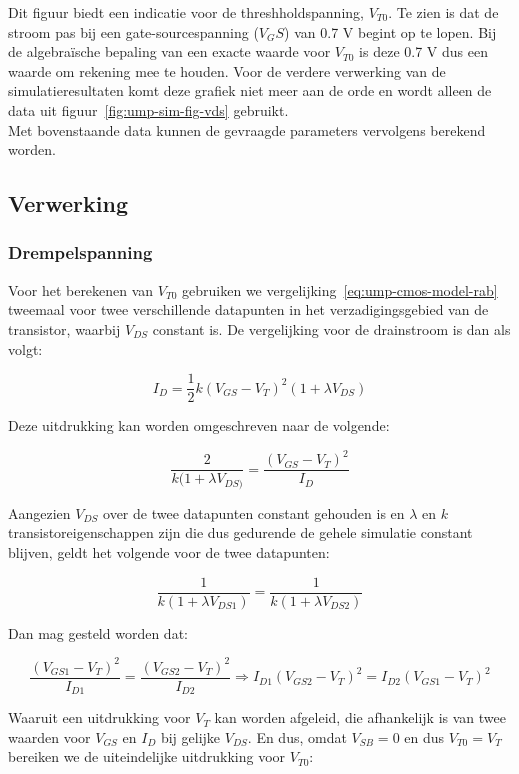 \documentclass{article}
\begin{document}
Dit figuur biedt een indicatie voor de threshholdspanning, $V_{T0}$. Te zien is dat de stroom pas bij een gate-sourcespanning ($V_GS$) van 0.7 V begint op te lopen. Bij de algebraïsche bepaling van een exacte waarde voor $V_{T0}$ is deze 0.7 V dus een waarde om rekening mee te houden. Voor de verdere verwerking van de simulatieresultaten komt deze grafiek niet meer aan de orde en wordt alleen de data uit figuur~\ref{fig:ump-sim-fig-vds} gebruikt.
\\

Met bovenstaande data kunnen de gevraagde parameters vervolgens berekend worden.

\subsection{Verwerking}
\label{subsec:ump-methode-verw}
\subsubsection{Drempelspanning}
\label{subsubsec:ump-methode-verw-vt0}
Voor het berekenen van $V_{T0}$ gebruiken we vergelijking~\ref{eq:ump-cmos-model-rab} tweemaal voor twee verschillende datapunten in het verzadigingsgebied van de transistor, waarbij $V_{DS}$ constant is. De vergelijking voor de drainstroom is dan als volgt:

\begin{equation} \label{eq:ump-cmos-model-rab-sat}
	I_{D} = \frac{1}{2} k (V_{GS} - V_{T})^2(1 + \lambda V_{DS})
\end{equation}

Deze uitdrukking kan worden omgeschreven naar de volgende:

$$\frac{2}{k(1 + \lambda V_{DS)}} = \frac{(V_{GS} - V_{T})^2}{I_{D}}$$

Aangezien $V_{DS}$ over de twee datapunten constant gehouden is en $\lambda$ en $k$ transistoreigenschappen zijn die dus gedurende de gehele simulatie constant blijven, geldt het volgende voor de twee datapunten:

$$\frac{1}{k(1 + \lambda V_{DS1})} = \frac{1}{k(1 + \lambda V_{DS2})}$$

Dan mag gesteld worden dat:

$$\frac{(V_{GS1} - V_{T})^2}{I_{D1}} = \frac{(V_{GS2} - V_{T})^2}{I_{D2}} \Rightarrow I_{D1}(V_{GS2} - V_{T})^2 = I_{D2}(V_{GS1} - V_{T})^2$$

Waaruit een uitdrukking voor $V_{T}$ kan worden afgeleid, die afhankelijk is van twee waarden voor $V_{GS}$ en $I_{D}$ bij gelijke $V_{DS}$. En dus, omdat $V_{SB} = 0$ en dus $V_{T0} = V_{T}$ bereiken we de uiteindelijke uitdrukking voor $V_{T0}$:
\end{document}
